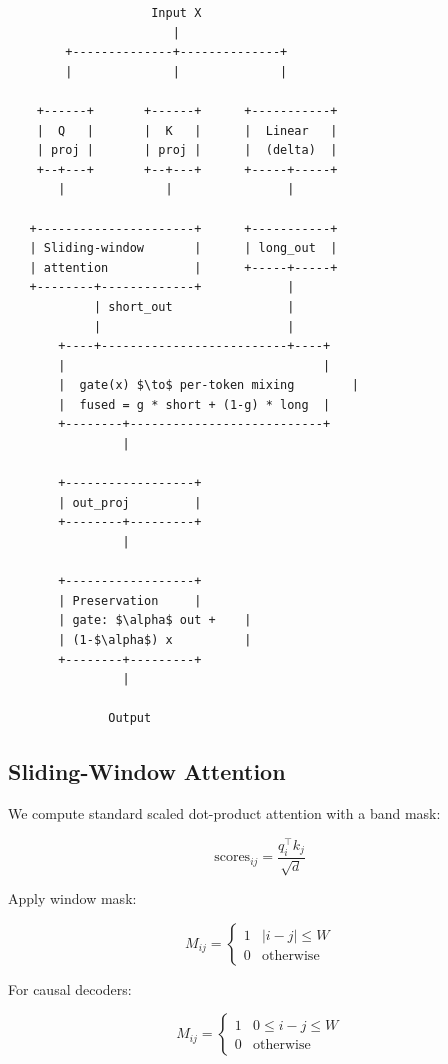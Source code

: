 \begin{lstlisting}
                    Input X
                       |
        +--------------+--------------+
        |              |              |
                                       
    +------+       +------+      +-----------+
    |  Q   |       |  K   |      |  Linear   |
    | proj |       | proj |      |  (delta)  |
    +--+---+       +--+---+      +-----+-----+
       |              |                |
                                        
   +----------------------+      +-----------+
   | Sliding-window       |      | long_out  |
   | attention            |      +-----+-----+
   +--------+-------------+            |
            | short_out                |
            |                          |
       +----+--------------------------+----+
       |                                    |
       |  gate(x) $\to$ per-token mixing        |
       |  fused = g * short + (1-g) * long  |
       +--------+---------------------------+
                |
                 
       +------------------+
       | out_proj         |
       +--------+---------+
                |
                 
       +------------------+
       | Preservation     |
       | gate: $\alpha$ out +    |
       | (1-$\alpha$) x          |
       +--------+---------+
                |
                 
              Output
\end{lstlisting}

\subsection{Sliding-Window Attention}

We compute standard scaled dot-product attention with a band mask:

\[
\text{scores}_{ij} = \frac{q_i^\top k_j}{\sqrt{d}}
\tag{4.1}
\]

Apply window mask:

\[
M_{ij} = \begin{cases} 1 & |i - j| \leq W \\ 0 & \text{otherwise} \end{cases}
\tag{4.2}
\]

For causal decoders:

\[
M_{ij} = \begin{cases} 1 & 0 \leq i - j \leq W \\ 0 & \text{otherwise} \end{cases}
\tag{4.3}
\]

